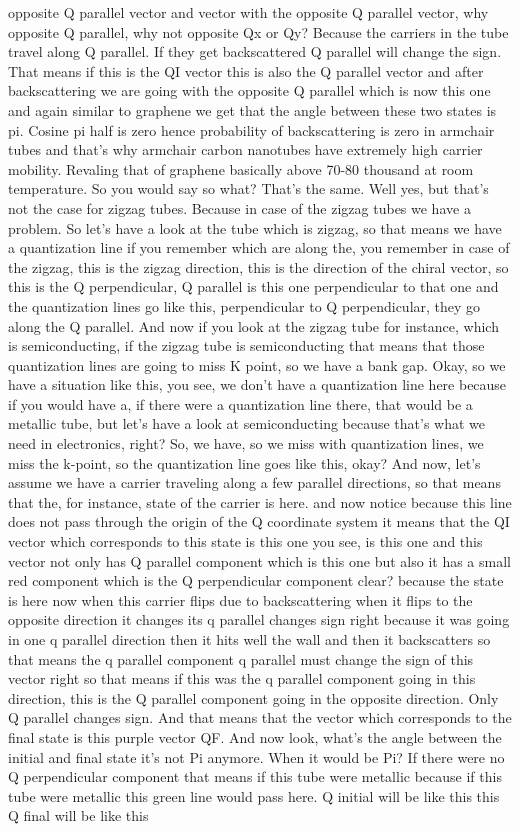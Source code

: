 opposite Q parallel vector and vector with the opposite Q parallel vector, why opposite Q parallel, why not opposite Qx or Qy? Because the carriers in the tube travel along Q parallel. If they get backscattered Q parallel will change the sign. That means if this is the QI vector this is also the Q parallel vector and after backscattering we are going with the opposite Q parallel which is now this one and again similar to graphene we get that the angle between these two states is pi. Cosine pi half is zero hence probability of backscattering is zero in armchair tubes and that's why armchair carbon nanotubes have extremely high carrier mobility. Revaling that of graphene basically above 70-80 thousand at room temperature. So you would say so what? That's the same. Well yes, but that's not the case for zigzag tubes. Because in case of the zigzag tubes we have a problem. So let's have a look at the tube which is zigzag, so that means we have a quantization line if you remember which are along the, you remember in case of the zigzag, this is the zigzag direction, this is the direction of the chiral vector, so this is the Q perpendicular, Q parallel is this one perpendicular to that one and the quantization lines go like this, perpendicular to Q perpendicular, they go along the Q parallel. And now if you look at the zigzag tube for instance, which is semiconducting, if the zigzag tube is semiconducting that means that those quantization lines are going to miss K point, so we have a bank gap. Okay, so we have a situation like this, you see, we don't have a quantization line here because if you would have a, if there were a quantization line there, that would be a metallic tube, but let's have a look at semiconducting because that's what we need in electronics, right? So, we have, so we miss with quantization lines, we miss the k-point, so the quantization line goes like this, okay? And now, let's assume we have a carrier traveling along a few parallel directions, so that means that the, for instance, state of the carrier is here. and now notice because this line does not pass through the origin of the Q coordinate system it means that the QI vector which corresponds to this state is this one you see, is this one and this vector not only has Q parallel component which is this one but also it has a small red component which is the Q perpendicular component clear? because the state is here now when this carrier flips due to backscattering when it flips to the opposite direction it changes its q parallel changes sign right because it was going in one q parallel direction then it hits well the wall and then it backscatters so that means the q parallel component q parallel must change the sign of this vector right so that means if this was the q parallel component going in this direction, this is the Q parallel component going in the opposite direction. Only Q parallel changes sign. And that means that the vector which corresponds to the final state is this purple vector QF. And now look, what's the angle between the initial and final state it's not Pi anymore. When it would be Pi? If there were no Q perpendicular component that means if this tube were metallic because if this tube were metallic this green line would pass here. Q initial will be like this this Q final will be like this 